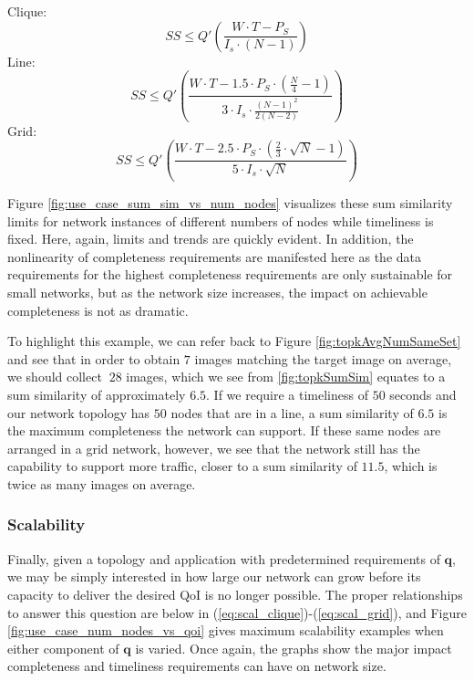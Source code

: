 \vspace{4mm}
\noindent
Clique:
\begin{equation}
	SS \leq Q'( \frac{W \cdot T - P_S}{I_s \cdot (N-1)} )
\end{equation}
Line:
\begin{equation}
	SS \leq Q'( \frac{W \cdot T - 1.5 \cdot P_S \cdot (\frac{N}{4} - 1)}{3 \cdot I_s \cdot \frac{(N-1)^2}{2(N-2)}} )
\end{equation}
Grid:
\begin{equation}
	SS \leq Q'( \frac{W \cdot T - 2.5 \cdot P_S \cdot (\frac{2}{3} \cdot \sqrt{N} - 1)}{5 \cdot I_s \cdot \sqrt{N}} )
\end{equation}

Figure \ref{fig:use_case_sum_sim_vs_num_nodes} visualizes these sum similarity limits for network instances of different numbers of nodes while timeliness is fixed.  Here, again, limits and trends are quickly evident.  In addition, the nonlinearity of completeness requirements are manifested here as the data requirements for the highest completeness requirements are only sustainable for small networks, but as the network size increases, the impact on achievable completeness is not as dramatic.  

To highlight this example, we can refer back to Figure \ref{fig:topkAvgNumSameSet} and see that in order to obtain $7$ images matching the target image on average, we should collect $~28$ images, which we see from \ref{fig:topkSumSim} equates to a sum similarity of approximately $6.5$.  If we require a timeliness of $50$ seconds and our network topology has $50$ nodes that are in a line, a sum similarity of $6.5$ is the maximum completeness the network can support.  If these same nodes are arranged in a grid network, however, we see that the network still has the capability to support more traffic, closer to a sum similarity of $11.5$, which is twice as many images on average.
 
\subsubsection{Scalability}

Finally, given a topology and application with predetermined requirements of $\mathbf{q}$, we may be simply interested in how large our network can grow before its capacity to deliver the desired QoI is no longer possible.  The proper relationships to answer this question are below in (\ref{eq:scal_clique})-(\ref{eq:scal_grid}), and Figure \ref{fig:use_case_num_nodes_vs_qoi} gives maximum scalability examples when either component of $\mathbf{q}$ is varied.  Once again, the graphs show the major impact completeness and timeliness requirements can have on network size.

